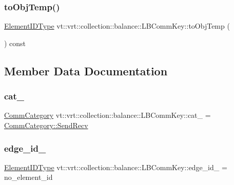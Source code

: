 \subsubsection{\texorpdfstring{to\+Obj\+Temp()}{toObjTemp()}}
{\footnotesize\ttfamily \hyperlink{namespacevt_1_1vrt_1_1collection_1_1balance_a14c8d2c972f2913aa3f1636e5be0a120}{Element\+I\+D\+Type} vt\+::vrt\+::collection\+::balance\+::\+L\+B\+Comm\+Key\+::to\+Obj\+Temp (\begin{DoxyParamCaption}{ }\end{DoxyParamCaption}) const\hspace{0.3cm}{\ttfamily [inline]}}



\subsection{Member Data Documentation}
\mbox{\label{structvt_1_1vrt_1_1collection_1_1balance_1_1_l_b_comm_key_aa1d2709bdb4721255b0ac7ab7706ad31}} 
\subsubsection{\texorpdfstring{cat\+\_\+}{cat\_}}
{\footnotesize\ttfamily \hyperlink{namespacevt_1_1vrt_1_1collection_1_1balance_a9cc6c6884ca0416dae824e9204093c57}{Comm\+Category} vt\+::vrt\+::collection\+::balance\+::\+L\+B\+Comm\+Key\+::cat\+\_\+ = \hyperlink{namespacevt_1_1vrt_1_1collection_1_1balance_a9cc6c6884ca0416dae824e9204093c57a95aeb71ffd419cc14c6929f9dcd6cdff}{Comm\+Category\+::\+Send\+Recv}}

\mbox{\label{structvt_1_1vrt_1_1collection_1_1balance_1_1_l_b_comm_key_acf007a220cdcb4ca6ebc8a8f781f1e75}} 
\subsubsection{\texorpdfstring{edge\+\_\+id\+\_\+}{edge\_id\_}}
{\footnotesize\ttfamily \hyperlink{namespacevt_1_1vrt_1_1collection_1_1balance_a14c8d2c972f2913aa3f1636e5be0a120}{Element\+I\+D\+Type} vt\+::vrt\+::collection\+::balance\+::\+L\+B\+Comm\+Key\+::edge\+\_\+id\+\_\+ = no\+\_\+element\+\_\+id}

